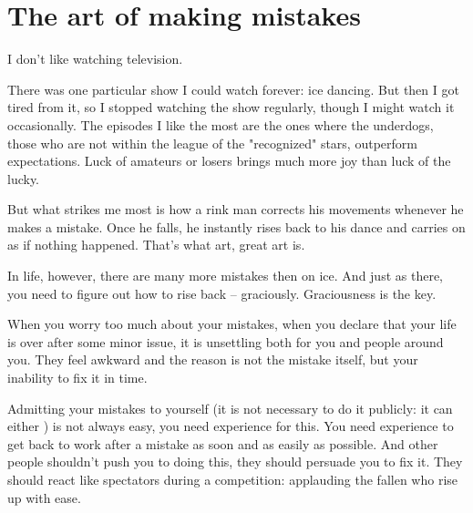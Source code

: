 \chapter{The art of making mistakes}

I don't like watching television.

There was one particular show I could watch forever: ice dancing. But then I got tired from it, so I stopped watching the show regularly, though I might watch it occasionally. The episodes I like the most are the ones where the underdogs, those who are not within the league of the "recognized" stars, outperform expectations. Luck of amateurs or losers brings much more joy than luck of the lucky.

But what strikes me most is how a rink man corrects his movements whenever he makes a mistake. Once he falls, he instantly rises back to his dance and carries on as if nothing happened. That's what art, great art is. 

In life, however, there are many more mistakes then on ice. And just as there, you need to figure out how to rise back -- graciously. Graciousness is the key.

When you worry too much about your mistakes, when you declare that your life is over after some minor issue, it is unsettling both for you and people around you. They feel awkward and the reason is not the mistake itself, but your inability to fix it in time.

Admitting your mistakes to yourself (it is not necessary to do it publicly: it can either ) is not always easy, you need experience for this. You need experience to get back to work after a mistake as soon and as easily as possible. And other people shouldn't push you to doing this, they should persuade you to fix it. They should react like spectators during a competition: applauding the fallen who rise up with ease.